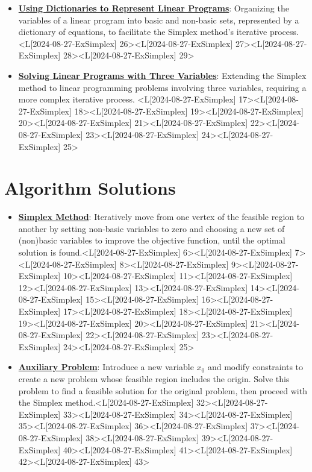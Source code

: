 \documentclass{article}%
\begin{document}
\begin{itemize}[[leftmargin=*]]
\item \href{https://www.math.purdue.edu/~yipn/421/2024-08-27-ExSimplex.pdf#page=26}{\textbf{Using Dictionaries to Represent Linear Programs}}: Organizing the variables of a linear program into basic and non-basic sets, represented by a dictionary of equations, to facilitate the Simplex method's iterative process. <L[2024-08-27-ExSimplex] 26><L[2024-08-27-ExSimplex] 27><L[2024-08-27-ExSimplex] 28><L[2024-08-27-ExSimplex] 29>%
\item \href{https://www.math.purdue.edu/~yipn/421/2024-08-27-ExSimplex.pdf#page=17}{\textbf{Solving Linear Programs with Three Variables}}: Extending the Simplex method to linear programming problems involving three variables, requiring a more complex iterative process. <L[2024-08-27-ExSimplex] 17><L[2024-08-27-ExSimplex] 18><L[2024-08-27-ExSimplex] 19><L[2024-08-27-ExSimplex] 20><L[2024-08-27-ExSimplex] 21><L[2024-08-27-ExSimplex] 22><L[2024-08-27-ExSimplex] 23><L[2024-08-27-ExSimplex] 24><L[2024-08-27-ExSimplex] 25>%
\end{itemize}%
\newpage

%
\section{Algorithm Solutions}%
\label{sec:AlgorithmSolutions}%
\begin{itemize}[[leftmargin=*]]%
\item \href{https://www.math.purdue.edu/~yipn/421/2024-08-27-ExSimplex.pdf#page=6}{\textbf{Simplex Method}}: Iteratively move from one vertex of the feasible region to another by setting non-basic variables to zero and choosing a new set of (non)basic variables to improve the objective function, until the optimal solution is found.<L[2024-08-27-ExSimplex] 6><L[2024-08-27-ExSimplex] 7><L[2024-08-27-ExSimplex] 8><L[2024-08-27-ExSimplex] 9><L[2024-08-27-ExSimplex] 10><L[2024-08-27-ExSimplex] 11><L[2024-08-27-ExSimplex] 12><L[2024-08-27-ExSimplex] 13><L[2024-08-27-ExSimplex] 14><L[2024-08-27-ExSimplex] 15><L[2024-08-27-ExSimplex] 16><L[2024-08-27-ExSimplex] 17><L[2024-08-27-ExSimplex] 18><L[2024-08-27-ExSimplex] 19><L[2024-08-27-ExSimplex] 20><L[2024-08-27-ExSimplex] 21><L[2024-08-27-ExSimplex] 22><L[2024-08-27-ExSimplex] 23><L[2024-08-27-ExSimplex] 24><L[2024-08-27-ExSimplex] 25>%
\item \href{https://www.math.purdue.edu/~yipn/421/2024-08-27-ExSimplex.pdf#page=32}{\textbf{Auxiliary Problem}}: Introduce a new variable  $x_0$ and modify constraints to create a new problem whose feasible region includes the origin. Solve this problem to find a feasible solution for the original problem, then proceed with the Simplex method.<L[2024-08-27-ExSimplex] 32><L[2024-08-27-ExSimplex] 33><L[2024-08-27-ExSimplex] 34><L[2024-08-27-ExSimplex] 35><L[2024-08-27-ExSimplex] 36><L[2024-08-27-ExSimplex] 37><L[2024-08-27-ExSimplex] 38><L[2024-08-27-ExSimplex] 39><L[2024-08-27-ExSimplex] 40><L[2024-08-27-ExSimplex] 41><L[2024-08-27-ExSimplex] 42><L[2024-08-27-ExSimplex] 43>%
\end{itemize}%
\newpage

%
\end{document}
